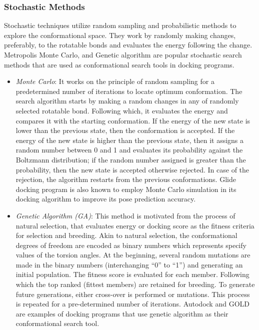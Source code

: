 \documentclass[10pt, a4paper]{book}
\begin{document}
\subsubsection*{Stochastic Methods}
Stochastic techniques utilize random sampling and probabilistic methods to explore the conformational space. They work by randomly making changes, preferably, to the rotatable bonds and evaluates the energy following the change. Metropolis Monte Carlo, and Genetic algorithm are popular stochastic search methods that are used as conformational search tools in docking programs. 

\begin{itemize}
    \item \textit{Monte Carlo}: It works on the principle of random sampling for a predetermined number of iterations to locate optimum conformation. The search algorithm starts by making a random changes in any of randomly selected rotatable bond. Following which, it evaluates the energy and compares it with the starting conformation. If the energy of the new state is lower than the previous state, then the conformation is accepted. If the energy of the new state is higher than the previous state, then it assigns a random number between 0 and 1 and evaluates its probability against the Boltzmann distribution; if the random number assigned is greater than the probability, then the new state is accepted otherwise rejected. In case of the rejection, the algorithm restarts from the previous conformations. Glide\cite{bib15} docking program is also known to employ Monte Carlo simulation in its docking algorithm to improve its pose prediction accuracy.
   
    \item \textit{Genetic Algorithm (GA)}: This method\cite{bib20, bib21} is motivated from the process of natural selection, that evaluates energy or docking score as the fitness criteria for selection and breeding. Akin to natural selection, the conformational degrees of freedom are encoded as binary numbers which represents specify values of the torsion angles. At the beginning, several random mutations are made in the binary numbers (interchanging “0” to “1”) and generating an initial population. The fitness score is evaluated for each member. Following which the top ranked (fittest members) are retained for breeding. To generate future generations, either cross-over is performed or mutations. This process is repeated for a pre-determined number of iterations. Autodock\cite{bib22} and GOLD\cite{bib20} are examples of docking programs that use genetic algorithm as their conformational search tool.
\end{itemize}   
\end{document}
